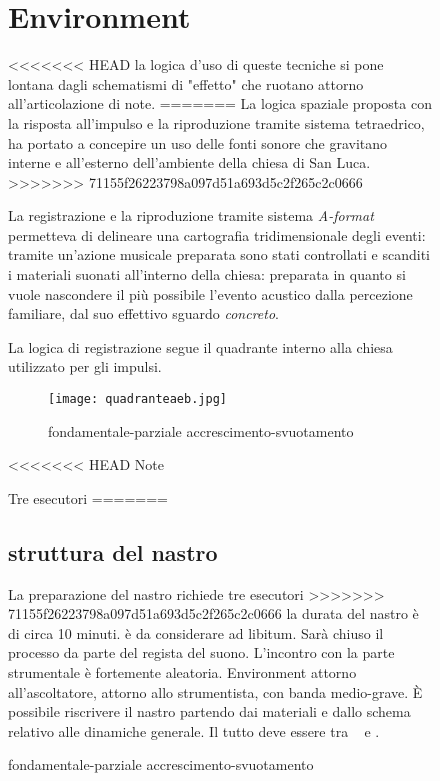 \begin{figure}
\section{Environment}

<<<<<<< HEAD
la logica d'uso di queste tecniche si pone lontana dagli schematismi di "effetto" che ruotano attorno all'articolazione di note.
=======
La logica spaziale proposta con la risposta all'impulso e la riproduzione tramite sistema
tetraedrico, ha portato a concepire un uso delle fonti sonore che gravitano interne e
all’esterno dell'ambiente della chiesa di San Luca.
>>>>>>> 71155f26223798a097d51a693d5c2f265c2c0666

La registrazione e la riproduzione tramite sistema \emph{A-format} permetteva di delineare una
cartografia tridimensionale degli eventi: tramite un'azione musicale preparata sono stati
controllati e scanditi i materiali suonati all'interno della chiesa: preparata in quanto
si vuole nascondere il più possibile l’evento acustico dalla percezione familiare, dal
suo effettivo sguardo \emph{concreto}.

La logica di registrazione segue il quadrante interno alla chiesa utilizzato per gli impulsi.



\begin{figure}[h]
\centering
{\texttt{[image: quadranteaeb.jpg]}}
\caption[Passaggio microtonale]{fondamentale-parziale accrescimento-svuotamento}
\label{fig:microtoni}
\end{figure}

<<<<<<< HEAD
Note

Tre esecutori
=======
\subsection{struttura del nastro}

La preparazione del nastro richiede tre esecutori                                                            
>>>>>>> 71155f26223798a097d51a693d5c2f265c2c0666
la durata del nastro è di circa 10 minuti.
è da considerare ad libitum. Sarà chiuso il processo da parte del regista del suono.
L'incontro con la parte strumentale è fortemente aleatoria. Environment attorno all’ascoltatore,
attorno allo strumentista, con banda medio-grave. È possibile riscrivere il nastro
partendo dai materiali e dallo schema relativo alle dinamiche generale. Il tutto deve
essere tra \ppp\ppp ~ e \pp .


\end{figure}
